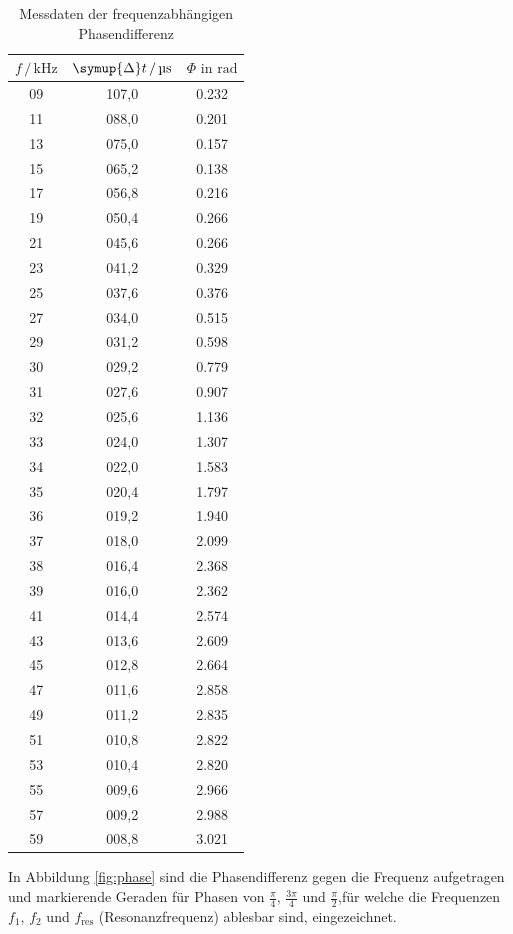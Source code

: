 \begin{table}
  \centering
  \caption{Messdaten der frequenzabhängigen Phasendifferenz}
  \label{tab:Messdaten3}
  \begin{tabular}{c c c}
  \toprule
  $f \,/\, \si{\kilo\hertz}$ & $\symup{\Delta} t \,/\, \si{\micro\second}$ & $\Phi \,\, \text{in rad} $ \\
  \midrule
09 & 107,0 & 0.232 \\
11 & 088,0 & 0.201 \\
13 & 075,0 & 0.157 \\
15 & 065,2 & 0.138 \\
17 & 056,8 & 0.216 \\
19 & 050,4 & 0.266 \\
21 & 045,6 & 0.266 \\
23 & 041,2 & 0.329 \\
25 & 037,6 & 0.376 \\
27 & 034,0 & 0.515 \\
29 & 031,2 & 0.598 \\
30 & 029,2 & 0.779 \\
31 & 027,6 & 0.907 \\
32 & 025,6 & 1.136 \\
33 & 024,0 & 1.307 \\
34 & 022,0 & 1.583 \\
35 & 020,4 & 1.797 \\
36 & 019,2 & 1.940 \\
37 & 018,0 & 2.099 \\
38 & 016,4 & 2.368 \\
39 & 016,0 & 2.362 \\
41 & 014,4 & 2.574 \\
43 & 013,6 & 2.609 \\
45 & 012,8 & 2.664 \\
47 & 011,6 & 2.858 \\
49 & 011,2 & 2.835 \\
51 & 010,8 & 2.822 \\
53 & 010,4 & 2.820 \\
55 & 009,6 & 2.966 \\
57 & 009,2 & 2.988 \\
59 & 008,8 & 3.021 \\
  \bottomrule
  \end{tabular}
  \end{table} 

  In Abbildung \ref{fig:phase} sind die Phasendifferenz gegen die Frequenz aufgetragen und markierende Geraden für Phasen von
  $\frac{\pi}{4}$, $\frac{3 \pi}{4}$ und $\frac{\pi}{2}$,für welche die Frequenzen $f_1$, $f_2$ und $f_\text{res}$ (Resonanzfrequenz)
  ablesbar sind, eingezeichnet.

